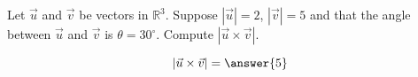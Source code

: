\documentclass{ximera}
\author{Gregory Hartman \and Matthew Carr}
\begin{document}
\begin{exercise}



Let $\vec{u}$ and $\vec{v}$ be vectors in $\mathbb{R}^3$. Suppose $|\vec{u}|=2$, $|\vec{v}|=5$ and that the angle between $\vec{u}$ and $\vec{v}$ is $\theta=30^{\circ}$. Compute $|\vec{u}\times\vec{v}|$.

\begin{prompt}
\[
|\vec{u}\times\vec{v}|=\answer{5}
\]
\end{prompt}


\end{exercise}
\end{document}

